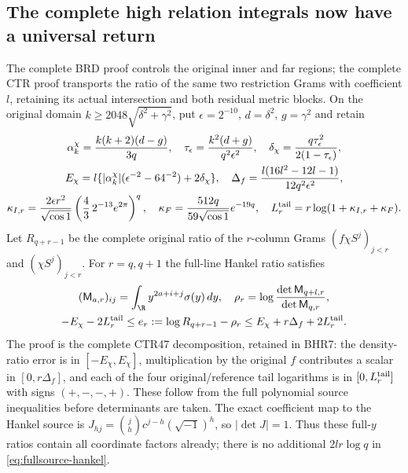 \subsection{The complete high relation integrals now have a universal return}
The complete BRD proof controls the original inner and far regions;
the complete CTR proof transports the ratio of the same two
restriction Grams with coefficient $l$, retaining its actual
intersection and both residual metric blocks. On the original
domain $k\geq2048\sqrt{\delta^2+\gamma^2}$, put
$\epsilon=2^{-10}$, $d=\delta^2$, $g=\gamma^2$ and retain
\begin{equation}
\begin{gathered}
 \alpha_k^\chi=\frac{k(k+2)(d-g)}{3q},\quad
 \tau_\epsilon=\frac{k^2(d+g)}{q^2\epsilon^2},\quad
 \delta_\chi=\frac{q\tau_\epsilon^2}{2(1-\tau_\epsilon)},\\
 E_\chi=l\{|\alpha_k^\chi|(\epsilon^{-2}-64^{-2})+2\delta_\chi\},
 \quad\Delta_f=\frac{l(16l^2-12l-1)}{12q^2\epsilon^2},\\
 \kappa_{I,r}=\frac{2\epsilon r^2}{\sqrt{\cos1}}
       \left(\frac43\,2^{-13}e^{2\pi}\right)^q,\quad
 \kappa_F=\frac{512q}{59\sqrt{\cos1}}e^{-19q},\quad
 L_r^{\rm tail}=r\log(1+\kappa_{I,r}+\kappa_F).
\end{gathered}\label{eq:fullsource-constants}
\end{equation}
Let $R_{q+r-1}$ be the complete original ratio of the
$r$-column Grams $(f\chi S^j)_{j<r}$ and $(\chi S^j)_{j<r}$.
For $r=q,q+1$ the full-line Hankel ratio satisfies
\begin{equation}
\begin{gathered}
 (\mathsf M_{a,r})_{ij}=\int_{\R}y^{2a+i+j}\sigma(y)\,dy,
 \quad\rho_r=\log\frac{\det\mathsf M_{q+l,r}}{\det\mathsf M_{q,r}},\\
 -E_\chi-2L_r^{\rm tail}\leq
 e_r:=\log R_{q+r-1}-\rho_r
 \leq E_\chi+r\Delta_f+2L_r^{\rm tail}.
\end{gathered}\label{eq:fullsource-hankel}
\end{equation}
The proof is the complete CTR47 decomposition, retained in BHR7:
the density-ratio error is in $[-E_\chi,E_\chi]$, multiplication
by the original $f$ contributes a scalar in $[0,r\Delta_f]$,
and each of the four original/reference tail logarithms is in
$[0,L_r^{\rm tail}]$ with signs $(+,-,-,+)$. These follow
from the full polynomial source inequalities before determinants
are taken. The exact coefficient map to the Hankel source is
$J_{hj}=\binom jh c^{j-h}(\sqrt{-1})^h$, so $|\det J|=1$.
Thus these full-$y$ ratios contain all coordinate factors already;
there is no additional $2lr\log q$ in \eqref{eq:fullsource-hankel}.

